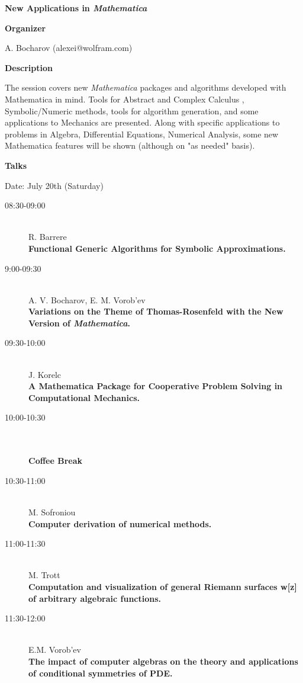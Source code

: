 \begin{center}
{\LARGE \bf New Applications in {\em Mathematica}}
\end{center}
\bigskip

{\bf Organizer}
\medskip

A. Bocharov (alexei@wolfram.com)

\bigskip

{\bf Description}
\medskip

The session covers new {\em Mathematica} packages and algorithms developed with Mathematica in
mind. Tools for Abstract and Complex Calculus , Symbolic/Numeric methods, tools for algorithm
generation, and some applications to Mechanics are presented. Along with specific applications to
problems in Algebra, Differential Equations, Numerical Analysis, some new Mathematica
features will be shown (although on "as needed" basis). 

\bigskip
{\bf Talks}
\medskip

Date: July 20th (Saturday) 

\begin{description}
\item[08:30-09:00] \ \\
  R. Barrere\\
  {\bf Functional Generic Algorithms for Symbolic Approximations.} 
\item[9:00-09:30] \ \\
  A. V. Bocharov, E. M. Vorob'ev\\
  {\bf Variations on the Theme of Thomas-Rosenfeld with the New
    Version of {\em Mathematica}.} 
\item[09:30-10:00] \ \\
  J. Korelc\\
  {\bf A Mathematica Package for Cooperative Problem Solving in Computational
    Mechanics.} 
\item[10:00-10:30] \ \\
  \\
  {\bf Coffee Break} 
\item[10:30-11:00 ] \ \\
  M. Sofroniou\\
  {\bf Computer derivation of numerical methods.} 
\item[11:00-11:30] \ \\
  M. Trott\\
  {\bf Computation and visualization of general Riemann surfaces w[z] of arbitrary algebraic
    functions.} 
\item[11:30-12:00] \ \\
  E.M. Vorob'ev\\
  {\bf The impact of computer algebras on the theory and applications of conditional
    symmetries of PDE.} 
\end{description}

